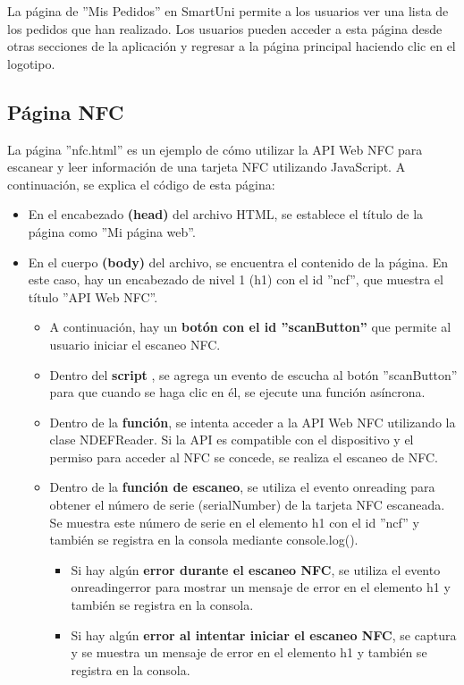 \documentclass[12pt]{report}
\begin{document}
La página de ''Mis Pedidos'' en SmartUni permite a los usuarios ver una lista de los pedidos que han realizado. Los usuarios pueden acceder a esta página desde otras secciones de la aplicación y regresar a la página principal haciendo clic en el logotipo.

\subsection{Página NFC}
La página ''nfc.html'' es un ejemplo de cómo utilizar la API Web NFC para escanear y leer información de una tarjeta NFC utilizando JavaScript. A continuación, se explica el código de esta página:

\begin{itemize}
    \item En el encabezado \textbf{(head) }del archivo HTML, se establece el título de la página como ''Mi página web''.

    \item En el cuerpo \textbf{(body)} del archivo, se encuentra el contenido de la página. En este caso, hay un encabezado de nivel 1 (h1) con el id ''ncf'', que muestra el título ''API Web NFC''.

    \begin{itemize}
        \item A continuación, hay un \textbf{botón con el id ''scanButton''} que permite al usuario iniciar el escaneo NFC.
        
        \item Dentro del \textbf{script} , se agrega un evento de escucha al botón ''scanButton'' para que cuando se haga clic en él, se ejecute una función asíncrona.
        
        \item Dentro de la \textbf{función}, se intenta acceder a la API Web NFC utilizando la clase NDEFReader. Si la API es compatible con el dispositivo y el permiso para acceder al NFC se concede, se realiza el escaneo de NFC.
        
        \item Dentro de la \textbf{función de escaneo}, se utiliza el evento onreading para obtener el número de serie (serialNumber) de la tarjeta NFC escaneada. Se muestra este número de serie en el elemento h1 con el id ''ncf'' y también se registra en la consola mediante console.log().
        
        \begin{itemize}
            \item Si hay algún \textbf{error durante el escaneo NFC}, se utiliza el evento onreadingerror para mostrar un mensaje de error en el elemento h1 y también se registra en la consola.
            
            \item Si hay algún \textbf{error al intentar iniciar el escaneo NFC}, se captura y se muestra un mensaje de error en el elemento h1 y también se registra en la consola.
        \end{itemize}
    \end{itemize}
\end{itemize}
\end{document}
